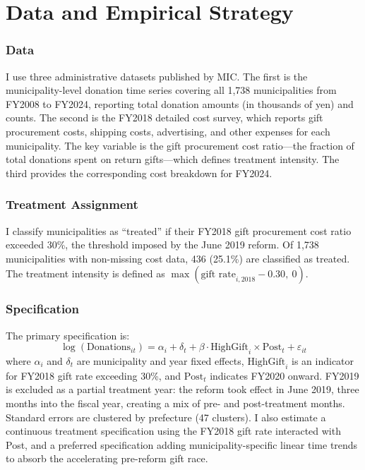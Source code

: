 \documentclass[12pt]{article}
\begin{document}
\section{Data and Empirical Strategy}

\subsubsection*{Data} I use three administrative datasets published by MIC. The first is the municipality-level donation time series covering all 1,738 municipalities from FY2008 to FY2024, reporting total donation amounts (in thousands of yen) and counts. The second is the FY2018 detailed cost survey, which reports gift procurement costs, shipping costs, advertising, and other expenses for each municipality. The key variable is the gift procurement cost ratio---the fraction of total donations spent on return gifts---which defines treatment intensity. The third provides the corresponding cost breakdown for FY2024.

\subsubsection*{Treatment Assignment} I classify municipalities as ``treated'' if their FY2018 gift procurement cost ratio exceeded 30\%, the threshold imposed by the June 2019 reform. Of 1,738 municipalities with non-missing cost data, 436 (25.1\%) are classified as treated. The treatment intensity is defined as $\max(\text{gift rate}_{i,2018} - 0.30,\ 0)$.

\subsubsection*{Specification} The primary specification is:
\begin{equation}
\log(\text{Donations}_{it}) = \alpha_i + \delta_t + \beta \cdot \text{HighGift}_i \times \text{Post}_t + \varepsilon_{it}
\label{eq:did}
\end{equation}
where $\alpha_i$ and $\delta_t$ are municipality and year fixed effects, $\text{HighGift}_i$ is an indicator for FY2018 gift rate exceeding 30\%, and $\text{Post}_t$ indicates FY2020 onward. FY2019 is excluded as a partial treatment year: the reform took effect in June 2019, three months into the fiscal year, creating a mix of pre- and post-treatment months. Standard errors are clustered by prefecture (47 clusters). I also estimate a continuous treatment specification using the FY2018 gift rate interacted with Post, and a preferred specification adding municipality-specific linear time trends to absorb the accelerating pre-reform gift race.
\end{document}
